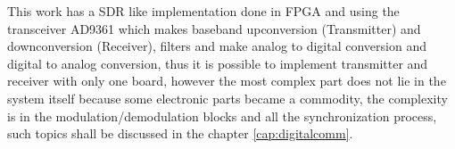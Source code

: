 This work has a SDR like implementation done in FPGA and using the transceiver
AD9361 which makes baseband upconversion (Transmitter) and downconversion
(Receiver), filters and make analog to digital conversion and digital to analog
conversion, thus it is possible to implement transmitter and receiver with only
one board, however the most complex part does not lie in the system itself
because some electronic parts became a commodity, the complexity is in the
modulation/demodulation blocks and all the synchronization process, such topics
shall be discussed in the chapter \ref{cap:digitalcomm}.
